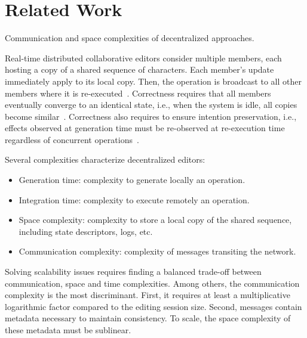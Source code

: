 \section{Related Work}
\label{sec:relatedwork}

\begin{table*}
  \centering
  
  \caption{\label{table:complexities}
    Communication and space complexities of decentralized approaches.}
\end{table*}

Real-time distributed collaborative editors consider multiple members, each
hosting a copy of a shared sequence of characters. Each member's update
immediately apply to its local copy. Then, the operation is broadcast to all
other members where it is re-executed~\cite{saito2005optimistic}. Correctness
requires that all members eventually converge to an identical state, i.e., when
the system is idle, all copies become
similar~\cite{bailis2013eventual}. Correctness also requires to ensure intention
preservation, i.e., effects observed at generation time must be re-observed at
re-execution time regardless of concurrent
operations~\cite{sun1998achieving}. 

Several complexities characterize decentralized editors:
\begin{itemize}
\item Generation time: complexity to generate locally an operation.
\item Integration time: complexity to execute remotely an operation.
\item Space complexity: complexity to store a local copy of the shared sequence,
  including state descriptors, logs, etc.
\item Communication complexity: complexity of messages transiting the network.
\end{itemize}
Solving scalability issues requires finding a balanced trade-off between
communication, space and time complexities.  Among others, the communication
complexity is the most discriminant. First, it requires at least a
multiplicative logarithmic factor compared to the editing session size. Second,
messages contain metadata necessary to maintain consistency. To scale, the space
complexity of these metadata must be sublinear.


